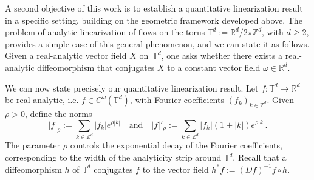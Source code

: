 \documentclass[12pt,reqno,a4paper]{amsart}%
\numberwithin{equation}{section}
\newtheorem{theorem}{Theorem}[section]
\newcommand{\A}{{\mathcal A}}
\newcommand{\Rr}{{\mathbb{R}}}
\newcommand{\Tt}{{\mathbb{T}}}
\newcommand{\Zz}{{\mathbb{Z}}}
\newcommand{\id}  {\operatorname{id}}
\newcommand{\rot}{\operatorname{rot}}
\def\vecalf{{\text{$\alpha$}}}
\begin{document}
A second objective of this work is to establish a quantitative linearization result in a specific setting, building on the geometric framework developed above. 
The problem of analytic linearization of flows on the torus $\Tt^d := \Rr^d / 2\pi \Zz^d$, with $d \geq 2$, provides a simple case of this general phenomenon, and we can state it as follows.
Given a real-analytic vector field $X$ on~$\Tt^d$, one asks whether there exists a real-analytic diffeomorphism that conjugates $X$ to a constant vector field $\omega \in \Rr^d$. 
%
%
%



We can now state precisely our quantitative linearization result.  
Let $f \colon \Tt^d \to \Rr^d$ be real analytic, i.e. $f \in C^\omega(\Tt^d)$, with Fourier coefficients $(f_k)_{k \in \Zz^d}$. 
Given $\rho > 0$, define the norms
$$
|f|_\rho := \sum_{k \in \Zz^d} |f_k| e^{\rho |k|}
\quad \text{and} \quad
|f|'_\rho := \sum_{k \in \Zz^d} |f_k| (1 + |k|) e^{\rho |k|}.
$$
The parameter $\rho$ controls the exponential decay of the Fourier coefficients, corresponding to the width of the analyticity strip around $\Tt^d$.
Recall that a diffeomorphism $h$ of $\Tt^d$ conjugates  $f$ to the vector field $h^*f:=(Df)^{-1}f\circ h$.
 
\end{document}
